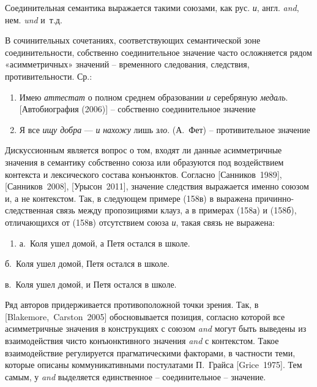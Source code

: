 Соединительная семантика выражается такими союзами, как рус. \emph{и},
англ. \emph{and}, нем. \emph{und} и~т.д.

В сочинительных сочетаниях, соответствующих семантической зоне
соединительности, собственно соединительное значение часто осложняется
рядом «асимметричных» значений -- временного следования, следствия,
противительности. Ср.:

\begin{enumerate}
\def\labelenumi{(\arabic{enumi})}
\setcounter{enumi}{155}
\item
  Имею \emph{аттестат} о полном среднем образовании \emph{и} серебряную
  \emph{медаль}. {[}Автобиография (2006){]} -- собственно соединительное
  значение
\item
  Я все \emph{ищу добра} --- \emph{и} \emph{нахожу} лишь \emph{зло}.
  (А.~Фет) -- противительное значение
\end{enumerate}

Дискуссионным является вопрос о том, входят ли данные асимметричные
значения в семантику собственно союза или образуются под воздействием
контекста и лексического состава конъюнктов. Согласно
{[}Санников~1989{]}, {[}Санников~2008{]}, {[}Урысон~2011{]}, значение
следствия выражается именно союзом и, а не контекстом. Так, в следующем
примере (158в) в выражена причинно-следственная связь между пропозициями
клауз, а в примерах (158а) и (158б), отличающихся от (158в) отсутствием
союза \emph{и}, такая связь не выражена:

\begin{enumerate}
\def\labelenumi{(\arabic{enumi})}
\setcounter{enumi}{157}
\item
  а.~Коля ушел домой, а Петя остался в школе.
\end{enumerate}

б.~Коля ушел домой, Петя остался в школе.

в.~Коля ушел домой, и Петя остался в школе.

Ряд авторов придерживается противоположной точки зрения. Так, в
{[}Blakemore,~Carston~2005{]} обосновывается позиция, согласно которой
все асимметричные значения в конструкциях с союзом \emph{and} могут быть
выведены из взаимодействия чисто конъюнктивного значения \emph{and} с
контекстом. Такое взаимодействие регулируется прагматическими факторами,
в частности теми, которые описаны коммуникативными постулатами П.~Грайса
{[}Grice~1975{]}. Тем самым, у \emph{and} выделяется единственное --
соединительное -- значение.

